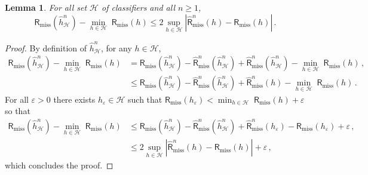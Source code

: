 \documentclass[a4paper,10pt,fleqn]{article}
\newcommand{\eqsp}{\,}
\newcommand{\calH}{\ensuremath{\mathcal{H}}}
\newcommand{\1}{\ensuremath{\mathbbm{1}}}
\newtheorem{lemma}{Lemma}
\begin{document}
\begin{lemma}
\label{lem:missclassif:ub}
For all set $\calH$ of classifiers and all $n\geqslant 1$,
$$
\mathsf{R}_{\mathrm{miss}}(\widehat h^n_{\calH}) - \underset{h\in\calH}{\min}\; \mathsf{R}_{\mathrm{miss}}\left(h\right) \leqslant 2 \underset{h\in\calH}{\sup}\left|\widehat{\mathsf{R}}^n_{\mathrm{miss}}(h) - \mathsf{R}_{\mathrm{miss}}\left(h\right)\right| \eqsp.
$$
\end{lemma}

\begin{proof}
By definition of $\widehat h^n_{\calH}$, for any $h\in\calH$,
\begin{align*}
\mathsf{R}_{\mathrm{miss}}(\widehat h^n_{\calH}) - \underset{h\in\calH}{\min}\; \mathsf{R}_{\mathrm{miss}}\left(h\right) &=  \mathsf{R}_{\mathrm{miss}}(\widehat h^n_{\calH})  - \widehat {\mathsf{R}}^n_{\mathrm{miss}}(\widehat h^n_{\calH}) + \widehat {\mathsf{R}}^n_{\mathrm{miss}}(\widehat h^n_{\calH}) - \underset{h\in\calH}{\min}\; \mathsf{R}_{\mathrm{miss}}\left(h\right)\eqsp,\\
&\leqslant \mathsf{R}_{\mathrm{miss}}(\widehat h^n_{\calH})  - \widehat {\mathsf{R}}^n_{\mathrm{miss}}(\widehat h^n_{\calH}) + \widehat {\mathsf{R}}^n_{\mathrm{miss}}(h) - \underset{h\in\calH}{\min}\; \mathsf{R}_{\mathrm{miss}}\left(h\right)\eqsp.
\end{align*}
For all $\varepsilon>0$ there exists $h_{\varepsilon}\in\calH$ such that  $\mathsf{R}_{\mathrm{miss}}(h_{\varepsilon})< \min_{h\in\calH}\; \mathsf{R}_{\mathrm{miss}}\left(h\right) + \varepsilon$ so that
\begin{align*}
\mathsf{R}_{\mathrm{miss}}(\widehat h^n_{\calH}) - \underset{h\in\calH}{\min}\; \mathsf{R}_{\mathrm{miss}}\left(h\right) &\leqslant \mathsf{R}_{\mathrm{miss}}(\widehat h^n_{\calH})  - \widehat {\mathsf{R}}^n_{\mathrm{miss}}(\widehat h^n_{\calH}) + \widehat {\mathsf{R}}^n_{\mathrm{miss}}(h_{\varepsilon}) - \mathsf{R}_{\mathrm{miss}}(h_{\varepsilon}) + \varepsilon\eqsp,\\
&\leqslant   2 \underset{h\in\calH}{\sup}\left|\widehat {\mathsf{R}}^n_{\mathrm{miss}}(h) - \mathsf{R}_{\mathrm{miss}}\left(h\right)\right| + \varepsilon\eqsp,
\end{align*}
which concludes the proof.
\end{proof}
\end{document}
